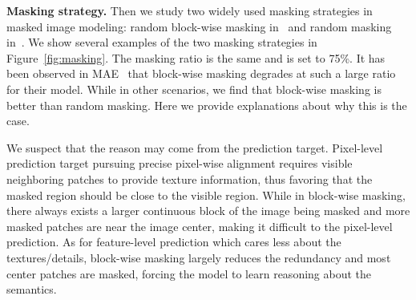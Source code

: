 \documentclass[runningheads]{llncs}
\begin{document}
\begin{table}[t]
	\centering
	\footnotesize
	\caption{We study the pre-training efficiency with the momentum encoder and report the performance as well as iteration time cost when feeding different fractions of the image to the momentum encoder.}
	\label{tab:inference}
	
	\vspace{-4mm}
\end{table}

\vspace{2mm}
\noindent \textbf{Masking strategy.}
Then we study two widely used masking strategies in masked image modeling: random block-wise masking in~\cite{bao2021beit} and random masking in~\cite{he2021masked}. We show several examples of the two masking strategies in Figure~\ref{fig:masking}.
The masking ratio is the same and is set to 75\%. 
It has been observed in MAE~\cite{he2021masked} that block-wise masking degrades at such a large ratio for their model. While in other scenarios, we find that block-wise masking is better than random masking.
Here we provide explanations about why this is the case.

We suspect that the reason may come from the prediction target. Pixel-level prediction target pursuing precise pixel-wise alignment requires visible neighboring patches to provide texture information, thus favoring that the masked region should be close to the visible region.
While in block-wise masking, there always exists a larger continuous block of the image being masked and more masked patches are near the image center, making it difficult to the pixel-level prediction.
As for feature-level prediction which cares less about the textures/details, block-wise masking largely reduces the redundancy and most center patches are masked, forcing the model to learn reasoning about the semantics. 
\end{document}
